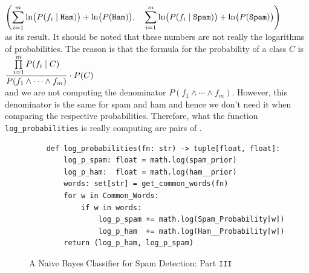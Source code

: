 \\[0.2cm]
\hspace*{1.3cm}
$\displaystyle \left(\sum\limits_{i=1}^m \ln\bigl(P(f_i \;|\; \mathtt{Ham})\bigr) + \ln\bigl(P(\mathtt{Ham}) \bigr),\quad
         \sum\limits_{i=1}^m \ln\bigl(P(f_i \;|\; \mathtt{Spam})\bigr) + \ln\bigl(P(\mathtt{Spam})\bigr) \right)$
\\[0.2cm]
as its result.  It should be noted that these numbers are not really the logarithms of probabilities.  The reason is that
the formula for the probability of a class $C$ is
\\[0.2cm]
\hspace*{1.3cm}
$\displaystyle \frac{\prod\limits_{i=1}^m P(f_i \;|\; C)}{P(f_1 \wedge \cdots \wedge f_m)} \cdot P(C) $
\\[0.2cm]
and we are not computing the denominator $P(f_1 \wedge \cdots \wedge f_m)$.  However, this denominator is the same for spam and ham and hence we don't need it when comparing the respective probabilities.  Therefore, what the function \texttt{log\_probabilities} is really computing are pairs of .

\begin{figure}[!ht]
\centering
\begin{verbatim}
    def log_probabilities(fn: str) -> tuple[float, float]:
        log_p_spam: float = math.log(spam_prior)
        log_p_ham:  float = math.log(ham__prior)
        words: set[str] = get_common_words(fn)
        for w in Common_Words:
            if w in words:
                log_p_spam += math.log(Spam_Probability[w])
                log_p_ham  += math.log(Ham__Probability[w])
        return (log_p_ham, log_p_spam)
\end{verbatim}
\caption{A Naive Bayes Classifier for Spam Detection: Part \texttt{III}}
\label{fig:Spam-Detection.ipynb-3}
\end{figure}

